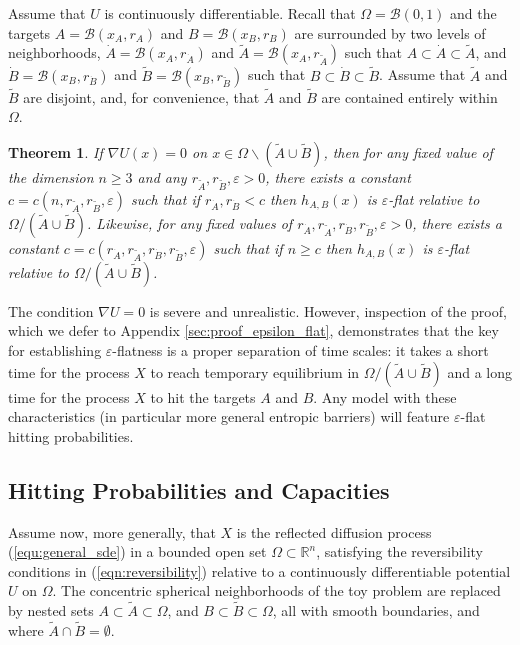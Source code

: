 \documentclass[nofootinbib,english, aip, jcp, priprint, graphicx,floatfix]{revtex4-1}
\newtheorem{theorem}{Theorem}
\theoremstyle{plain}
\theoremstyle{definition}
\theoremstyle{plain}
\newcommand{\bb}[1]{\mathcal{B}\left(#1\right)}
\newcommand{\dA}{{\dot A}}
\newcommand{\tA}{{\tilde A}}
\newcommand{\dB}{{\dot B}}
\newcommand{\tB}{{\tilde B}}
\begin{document}
Assume that $U$ is continuously differentiable.  Recall that $\Omega=\bb{0,1}$ and the targets 
$A=\bb{x_A,r_A }$ and $B=\bb{x_B,r_B }$ are surrounded by two levels of neighborhoods, 
$\dA=\bb{x_A,r_\dA }$ and $\tA=\bb{x_A,r_\tA }$ such that $A \subset \dA \subset \tA$, and 
$\dB=\bb{x_B,r_\dB }$ and $\tB=\bb{x_B,r_\tB }$ such that
$B \subset \dB \subset \tB$. Assume that $\tA$ and $\tB$ are disjoint, and, for convenience, that $\tA$ and $\tB$ are contained entirely within $\Omega$.
\begin{theorem}\label{thm:epsilon_flat}
If $\nabla U(x)=0$ on $x\in\Omega\backslash(\tA\cup\tB)$, then
for any fixed value of the dimension $n \geq 3$ and any $r_{\tilde{A}}, r_{\tilde{B}}, \varepsilon > 0$, there exists a constant $c=c(n, r_{\tilde{A}}, r_{\tilde{B}}, \varepsilon)$ such that if $r_{\dA}, r_{\dB} < c$ then 
$h_{A,B}(x)$ is 
$\varepsilon$-flat  relative to 
$\Omega / (\tilde{A} \cup \tilde{B})$.  
Likewise, for any fixed values of $r_{\dA}, r_{\tilde{A}}, r_{\dB}, r_{\tilde{B}}, \varepsilon>0$, there exists a constant $c=c(r_\dA, r_{\tilde{A}}, r_\dB, r_{\tilde{B}}, \varepsilon)$ such that if $n \geq c$ then 
$h_{A,B}(x)$ is
$\varepsilon$-flat relative to 
$\Omega / (\tilde{A} \cup \tilde{B})$. 
\end{theorem}

The condition $\nabla U=0$ is severe and unrealistic.
However, inspection of the proof, which we defer to 
Appendix \ref{sec:proof_epsilon_flat}, demonstrates that the key for establishing $\varepsilon$-flatness is a proper separation of time scales: it takes a short time for the process $X$ to reach temporary equilibrium in $\Omega / (\tilde{A} \cup \tilde{B})$ and a long time for the process $X$ to hit the targets $A$ and $B$.  Any model with these characteristics (in particular more general entropic barriers) will feature $\varepsilon$-flat hitting probabilities.

\subsection{Hitting Probabilities and Capacities}
\label{subsec:Capacities}

Assume now, more generally, that $X$ is  
the reflected diffusion process (\ref{equ:general_sde}) in a bounded open set $\Omega \subset \mathbb{R}^n$, satisfying the reversibility conditions in (\ref{eqn:reversibility}) relative to a continuously differentiable potential $U$ on $\Omega$.
The concentric spherical neighborhoods of the toy problem are replaced by nested sets 
$A \subset\tA\subset\Omega$, and 
$B \subset\tB\subset\Omega$,
all with smooth boundaries, and where $\tA\cap\tB=\emptyset$.
\end{document}

